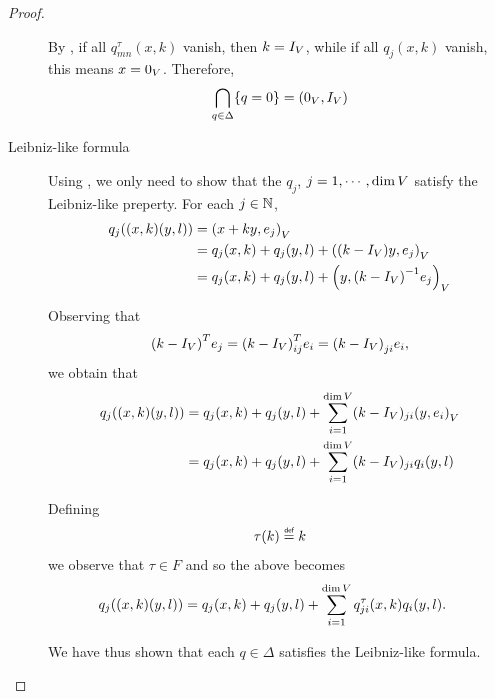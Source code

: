 \begin{proof}
\begin{description}
            By \cite[Lemma 5.11]{Fischer2015},
            if all $q^\tau_{m n}(x, k)$ vanish, then $k = {I_{V}}$,
            while if all $q_j(x, k)$ vanish, this means $x = 0_V$.
            Therefore,
            \begin{align*}
                \bigcap_{q \in \Delta} \{q = 0\} = (0_V, {I_{V}})
            \end{align*}
        \item [Leibniz-like formula]
            Using \cite[Corollary 5.13]{Fischer2015},
            we only need to show that the $q_j$, $j = 1, \cdots, \dim V$ satisfy the Leibniz-like preperty.
            For each $j \in \mathbb{N}$,
            \begin{align*}
                q_j((x, k) (y, l))
                &= {\left(x + k y, e_j\right)_{V}}\\
                &= q_j(x, k) + q_j(y, l) + {\left((k - {I_{V}}) y, e_j\right)_{V}}\\
                &= q_j(x, k) + q_j(y, l) + {\left(y, {(k - {I_{V}})}^{-1} e_j\right)_{V}}
            \end{align*}

            Observing that
            \begin{align*}
                {(k - {I_{V}})}^T e_j
                = {(k - {I_{V}})}^T_{i j} e_i
                = {(k - {I_{V}})}_{j i} e_i,
            \end{align*}
            we obtain that
            \begin{align*}
                q_j((x, k) (y, l))
                &= q_j(x, k) + q_j(y, l) + \sum_{i = 1}^{\dim V} (k - {I_{V}})_{j i} {\left(y, e_i\right)_{V}}\\
                &= q_j(x, k) + q_j(y, l) + \sum_{i = 1}^{\dim V} (k - {I_{V}})_{j i} q_i(y, l)
            \end{align*}

            Defining
            \begin{align*}
                \tau(k) \defeq k
            \end{align*}
            we observe that $\tau \in F$ and so the above becomes
            \begin{align*}
                q_j((x, k) (y, l))
                &= q_j(x, k) + q_j(y, l) + \sum_{i = 1}^{\dim V} q^{\tau}_{j i}(x, k) q_i(y, l).
            \end{align*}

            We have thus shown that each $q \in \Delta$ satisfies the Leibniz-like formula.
    \end{description}
\end{proof}


